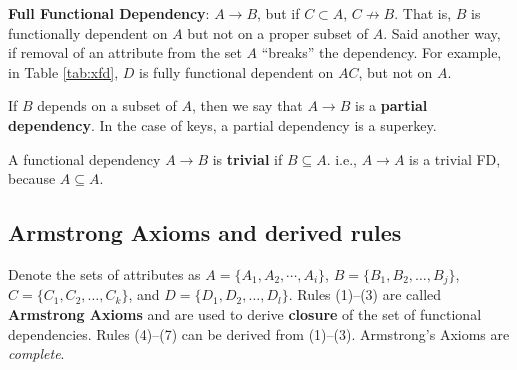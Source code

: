 \documentclass{article}
\begin{document}
\begin{outline}
\1 \textbf{Full Functional Dependency}: $A \to B$, but if $C \subset A$, $C \not\to B$.  That is, $B$ is functionally dependent on $A$ but not on a proper subset of $A$.  Said another way, if removal of an attribute from the set $A$ ``breaks'' the dependency.  For example, in Table \ref{tab:xfd}, $D$ is fully functional dependent on $AC$, but not on $A$.    
         
          \2 If $B$ depends on a subset of $A$, then we say that $A \to B$ is a \textbf{partial dependency}.  In the case of keys, a partial dependency is a superkey.  
 



\1 A functional dependency $A \to B$ is \textbf{trivial} if $B \subseteq A$.
        \2  i.e., $A \to A$ is a trivial FD, because $A \subseteq A$.    




 
%
       
 






\end{outline}
  

  
  
  


\subsection*{Armstrong Axioms and derived rules}
Denote the sets of attributes as $A = \{A_1, A_2, \cdots , A_i\}$, $B = \{B_1, B_2, \dots, B_j \}$, $C = \{C_1, C_2, \dots, C_k \}$, and $D = \{D_1, D_2,
\dots, D_l \}$.  Rules (1)--(3) are called \textbf{Armstrong Axioms} \cite{armstrong1974dependency1}  and are used to derive \textbf{closure} of the set of functional dependencies.    Rules (4)--(7) can be derived from (1)--(3).
 Armstrong's Axioms are  \textit{complete}.  
\end{document}
